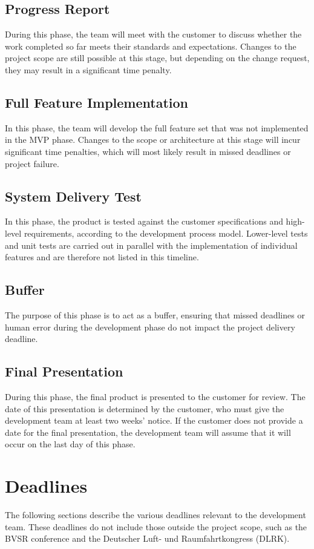 \subsection{Progress Report}
During this phase, the team will meet with the customer to discuss whether the work completed so far meets their standards and expectations. Changes to the project scope are still possible at this stage, but depending on the change request, they may result in a significant time penalty.

\subsection{Full Feature Implementation}
In this phase, the team will develop the full feature set that was not implemented in the MVP phase. Changes to the scope or architecture at this stage will incur significant time penalties, which will most likely result in missed deadlines or project failure.

\subsection{System Delivery Test}
In this phase, the product is tested against the customer specifications and high-level requirements, according to the development process model. Lower-level tests and unit tests are carried out in parallel with the implementation of individual features and are therefore not listed in this timeline.

\subsection{Buffer}
The purpose of this phase is to act as a buffer, ensuring that missed deadlines or human error during the development phase do not impact the project delivery deadline.

\subsection{Final Presentation}
During this phase, the final product is presented to the customer for review. The date of this presentation is determined by the customer, who must give the development team at least two weeks' notice. If the customer does not provide a date for the final presentation, the development team will assume that it will occur on the last day of this phase.

\section{Deadlines}
The following sections describe the various deadlines relevant to the development team. These deadlines do not include those outside the project scope, such as the BVSR conference and the Deutscher Luft- und Raumfahrtkongress (DLRK).

